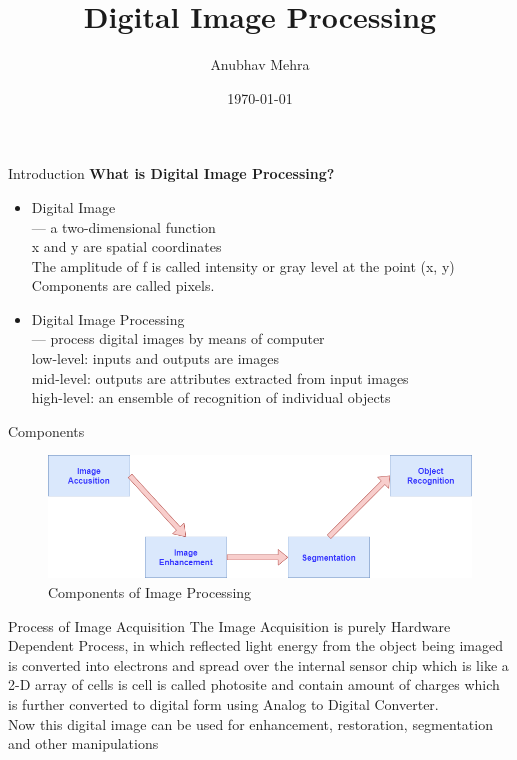 \documentclass[12pt]{beamer}
\author{Anubhav Mehra}
\title{Digital Image Processing}
\institute{S.S.J. Campus, Almora}
\date{\today}
\begin{document}
\maketitle
\begin{frame}{Introduction}
 \textbf{What is Digital Image Processing?} \\
      \begin{itemize}
      \item {
        Digital Image \\
          — a two-dimensional function \\
              x and y are spatial coordinates \\
              The amplitude of f  is called intensity or gray level at the point (x, y) \\
              Components are called pixels.
      }
      \item {
       Digital Image Processing \\ 
          — process digital images by means of computer\\ [0.5ex]
         low-level: inputs and outputs are images \\ 
         mid-level: outputs are attributes extracted from input images \\
         high-level: an ensemble of recognition of individual objects \\
      }
      \end{itemize}


\end{frame}
\begin{frame}{Components}
\begin{figure}[H]
\begin{center}
\caption{Components of Image Processing}
\includegraphics[scale=0.3]{com.png}
\end{center}
\end{figure}
\end{frame}

\begin{frame}{ Process of Image Acquisition}
The Image Acquisition is purely Hardware
Dependent Process, in which reflected light energy
from the object being imaged is converted into
electrons and spread over the internal sensor chip
which is like a 2-D array of cells is cell is called
photosite and contain amount of charges which is
further converted to digital form using Analog to
Digital Converter. \\[1ex]

Now this digital image can be used for
enhancement, restoration, segmentation and other
manipulations
\end{frame}
\end{document}
